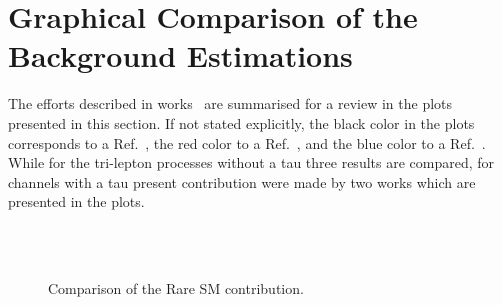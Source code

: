 \newpage
\appendix
\section{Graphical Comparison of the Background Estimations}
\label{app:graphical}
The efforts described in works~\cite{AN2012:248,AN2012:255,AN2012:256} are summarised for 
a review in the plots presented in this section. If not stated explicitly, the black color in the plots corresponds to 
a Ref.~\cite{AN2012:248}, the red color to a Ref.~\cite{AN2012:255}, and the blue color to a Ref.~\cite{AN2012:256}.
While for the tri-lepton processes without a tau three results are compared, for channels with a tau present
contribution were made by two works which are presented in the plots.
\begin{figure}[htp]
\begin{center}
 \\
 \\
\caption{Comparison of the Rare SM contribution.}
\label{fig:rare1}
\end{center}
\end{figure}
